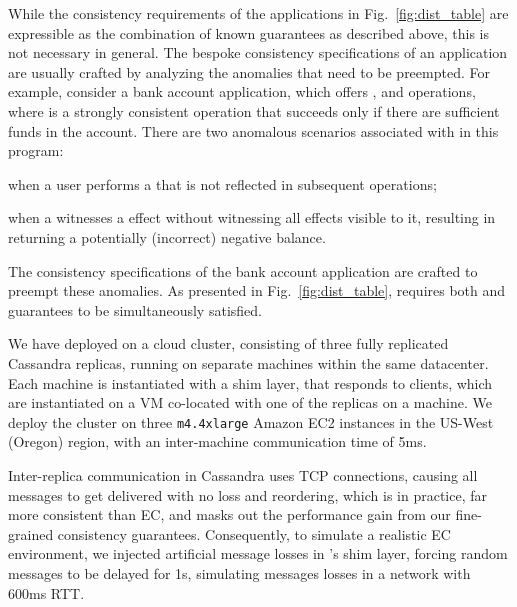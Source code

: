 
%
While the consistency requirements of the applications in
Fig.~\ref{fig:dist_table} are expressible as the combination of known
guarantees as described above, this is not necessary in general. The
bespoke consistency specifications of an application are usually
crafted by analyzing the anomalies that need to be preempted.  For
example, consider a bank account application, which offers \dRV{},
\wdRV{} and \gbRV{} operations, where \wdRV{} is a strongly consistent
operation that succeeds only if there are sufficient funds in the
account. There are two anomalous scenarios associated with \gbRV{} in
this program: \begin{enumerate*}[label=(\roman*)] \item when a user
      performs a \dRV{} that is not reflected in subsequent \gbRV{}
    operations; \item when a \gbRV{} witnesses a \wdRV{} effect
without witnessing all \dRV{} effects visible to it,  resulting in
\gbRV{} returning a potentially (incorrect) negative balance.
\end{enumerate*} The consistency specifications of  the bank account
application are crafted to preempt these anomalies. As presented in
Fig.~\ref{fig:dist_table}, \gbRV{} requires both \rmwCTRT{} and
\visCTRT{} guarantees to be simultaneously satisfied.


We have deployed \tool on a cloud cluster,
consisting of three fully replicated Cassandra replicas, running on
separate machines within the same
datacenter. 
Each machine is instantiated with a
\tool shim layer, that responds to clients,  
 which are instantiated on a VM 
co-located with one of the replicas on a machine.
We deploy the cluster on three \texttt{m4.4xlarge} Amazon EC2 instances
in the US-West (Oregon) region, with an inter-machine communication time of 5ms.

Inter-replica communication in Cassandra uses TCP connections, causing
all messages to get delivered with no loss and reordering, which is in
practice, far more consistent than EC, and masks out the performance
gain from our fine-grained consistency guarantees.  Consequently, to
simulate a realistic EC environment, we injected artificial message
losses in \tool's shim layer, forcing random messages to be delayed
for 1s, simulating messages losses in a network with 600ms RTT.

